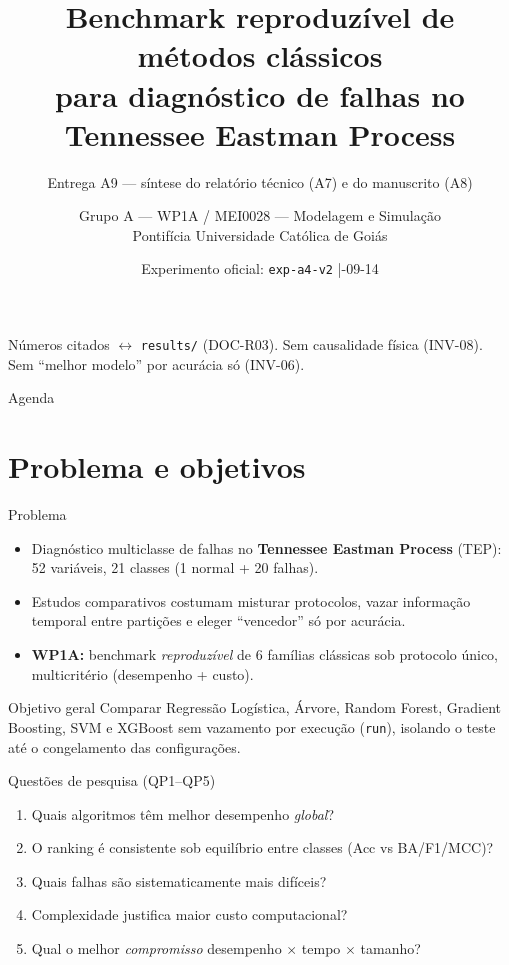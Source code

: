 \documentclass[aspectratio=169,11pt]{beamer}
\title[WP1A --- Benchmark TEP]{Benchmark reproduzível de métodos clássicos\\
para diagnóstico de falhas no Tennessee Eastman Process}
\subtitle{Entrega A9 --- síntese do relatório técnico (A7) e do manuscrito (A8)}
\author{Grupo A --- WP1A / MEI0028 --- Modelagem e Simulação\\
Pontifícia Universidade Católica de Goiás}
\date{Experimento oficial: \texttt{exp-a4-v2} \quad|\quad 2026-09-14}
\begin{document}
\begin{frame}
\titlepage
\vspace{-0.5em}
\centering
{\scriptsize Números citados $\leftrightarrow$ \texttt{results/} (DOC-R03). Sem causalidade física (INV-08).\\
Sem ``melhor modelo'' por acurácia só (INV-06).}
\end{frame}

\begin{frame}{Agenda}
\tableofcontents
\end{frame}

\section{Problema e objetivos}
\begin{frame}{Problema}
\begin{itemize}
  \item Diagnóstico multiclasse de falhas no \textbf{Tennessee Eastman Process} (TEP):
        52 variáveis, 21 classes (1 normal + 20 falhas).
  \item Estudos comparativos costumam misturar protocolos, vazar informação temporal
        entre partições e eleger ``vencedor'' só por acurácia.
  \item \textbf{WP1A:} benchmark \emph{reproduzível} de 6 famílias clássicas sob
        protocolo único, multicritério (desempenho + custo).
\end{itemize}
\bigskip
\begin{block}{Objetivo geral}
Comparar Regressão Logística, Árvore, Random Forest, Gradient Boosting, SVM e
XGBoost sem vazamento por execução (\texttt{run}), isolando o teste até o
congelamento das configurações.
\end{block}
\end{frame}

\begin{frame}{Questões de pesquisa (QP1--QP5)}
\begin{enumerate}
  \item[\textbf{QP1}] Quais algoritmos têm melhor desempenho \emph{global}?
  \item[\textbf{QP2}] O ranking é consistente sob equilíbrio entre classes
        (Acc vs BA/F1/MCC)?
  \item[\textbf{QP3}] Quais falhas são sistematicamente mais difíceis?
  \item[\textbf{QP4}] Complexidade justifica maior custo computacional?
  \item[\textbf{QP5}] Qual o melhor \emph{compromisso} desempenho $\times$ tempo $\times$ tamanho?
\end{enumerate}
\end{frame}
\end{document}
